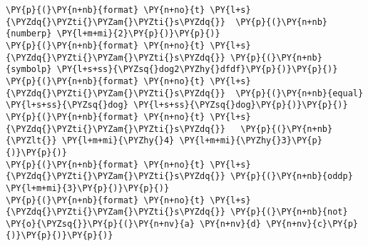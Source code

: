 \begin{Verbatim}[commandchars=\\\{\}]
\PY{p}{(}\PY{n+nb}{format} \PY{n+no}{t} \PY{l+s}{\PYZdq{}\PYZti{}\PYZam{}\PYZti{}s\PYZdq{}}  \PY{p}{(}\PY{n+nb}{numberp} \PY{l+m+mi}{2}\PY{p}{)}\PY{p}{)}
\PY{p}{(}\PY{n+nb}{format} \PY{n+no}{t} \PY{l+s}{\PYZdq{}\PYZti{}\PYZam{}\PYZti{}s\PYZdq{}} \PY{p}{(}\PY{n+nb}{symbolp} \PY{l+s+ss}{\PYZsq{}dog2\PYZhy{}dfdf}\PY{p}{)}\PY{p}{)}
\PY{p}{(}\PY{n+nb}{format} \PY{n+no}{t} \PY{l+s}{\PYZdq{}\PYZti{}\PYZam{}\PYZti{}s\PYZdq{}}  \PY{p}{(}\PY{n+nb}{equal} \PY{l+s+ss}{\PYZsq{}dog} \PY{l+s+ss}{\PYZsq{}dog}\PY{p}{)}\PY{p}{)}
\PY{p}{(}\PY{n+nb}{format} \PY{n+no}{t} \PY{l+s}{\PYZdq{}\PYZti{}\PYZam{}\PYZti{}s\PYZdq{}}   \PY{p}{(}\PY{n+nb}{\PYZlt{}} \PY{l+m+mi}{\PYZhy{}4} \PY{l+m+mi}{\PYZhy{}3}\PY{p}{)}\PY{p}{)}
\PY{p}{(}\PY{n+nb}{format} \PY{n+no}{t} \PY{l+s}{\PYZdq{}\PYZti{}\PYZam{}\PYZti{}s\PYZdq{}} \PY{p}{(}\PY{n+nb}{oddp} \PY{l+m+mi}{3}\PY{p}{)}\PY{p}{)}
\PY{p}{(}\PY{n+nb}{format} \PY{n+no}{t} \PY{l+s}{\PYZdq{}\PYZti{}\PYZam{}\PYZti{}s\PYZdq{}} \PY{p}{(}\PY{n+nb}{not} \PY{o}{\PYZsq{}}\PY{p}{(}\PY{n+nv}{a} \PY{n+nv}{d} \PY{n+nv}{c}\PY{p}{)}\PY{p}{)}\PY{p}{)}
\end{Verbatim}
